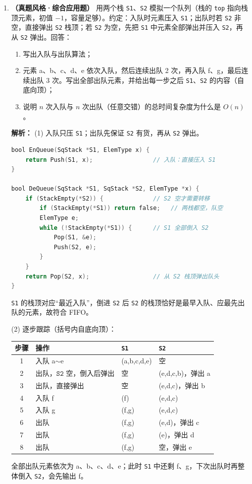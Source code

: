 \begin{enumerate}[resume]
\item \textbf{（真题风格·综合应用题）} 用两个栈 \texttt{S1}、\texttt{S2} 模拟一个队列（栈的 \texttt{top} 指向栈顶元素，初值 $-1$，容量足够）。约定：入队时元素压入 \texttt{S1}；出队时若 \texttt{S2} 非空，直接弹出 \texttt{S2} 栈顶；若 \texttt{S2} 为空，先把 \texttt{S1} 中元素全部弹出并压入 \texttt{S2}，再从 \texttt{S2} 弹出。回答：
\begin{enumerate}
\item[(1)] 写出入队与出队算法；
\item[(2)] 元素 a、b、c、d、e 依次入队，然后连续出队 2 次，再入队 f、g，最后连续出队 3 次。写出全部出队元素，并给出每一步之后 \texttt{S1}、\texttt{S2} 的内容（自底向顶）；
\item[(3)] 说明 $n$ 次入队与 $n$ 次出队（任意交错）的总时间复杂度为什么是 $O(n)$。
\end{enumerate}

\ifshowsolutions\par\noindent\textbf{解析：}
(1) 入队只压 \texttt{S1}；出队先保证 \texttt{S2} 有货，再从 \texttt{S2} 弹出。
\begin{lstlisting}[language=C]
bool EnQueue(SqStack *S1, ElemType x) {
    return Push(S1, x);                 // 入队：直接压入 S1
}

bool DeQueue(SqStack *S1, SqStack *S2, ElemType *x) {
    if (StackEmpty(*S2)) {              // S2 空才需要转移
        if (StackEmpty(*S1)) return false;   // 两栈都空，队空
        ElemType e;
        while (!StackEmpty(*S1)) {      // S1 全部倒入 S2
            Pop(S1, &e);
            Push(S2, e);
        }
    }
    return Pop(S2, x);                  // 从 S2 栈顶弹出队头
}
\end{lstlisting}
\texttt{S1} 的栈顶对应“最近入队”，倒进 \texttt{S2} 后 \texttt{S2} 的栈顶恰好是最早入队、应最先出队的元素，故符合 FIFO。

(2) 逐步跟踪（括号内自底向顶）：
\begin{center}
\begin{tabular}{clll}
\toprule
步骤 & 操作 & \texttt{S1} & \texttt{S2} \\
\midrule
1 & 入队 a$\sim$e & (a,b,c,d,e) & 空 \\
2 & 出队，$\texttt{S2}$ 空，倒入后弹出 & 空 & (e,d,c,b)，弹出 a \\
3 & 出队，直接弹出 & 空 & (e,d,c)，弹出 b \\
4 & 入队 f & (f) & (e,d,c) \\
5 & 入队 g & (f,g) & (e,d,c) \\
6 & 出队 & (f,g) & (e,d)，弹出 c \\
7 & 出队 & (f,g) & (e)，弹出 d \\
8 & 出队 & (f,g) & 空，弹出 e \\
\bottomrule
\end{tabular}
\end{center}
全部出队元素依次为 a、b、c、d、e；此时 \texttt{S1} 中还剩 f、g，下次出队时再整体倒入 \texttt{S2}，会先输出 f。


\end{enumerate}
